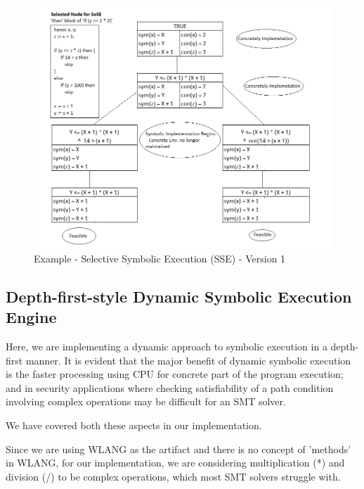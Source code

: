 \documentclass[11pt]{llncs}
\begin{document}
			\begin{figure}[H]
				\includegraphics[width=1.05\textwidth]{SeSE_Version1_Example.png}
				\caption{Example - Selective Symbolic Execution (SSE) - Version 1} \label{fig_4}
			\end{figure}
			
			\vspace{-2mm}


	\subsection{Depth-first-style Dynamic Symbolic Execution Engine} \label{Depth-first-style Dynamic Symbolic Execution Engine}
		Here, we are implementing a dynamic approach to symbolic execution in a depth-first manner.
		It is evident that the major benefit of dynamic symbolic execution is the faster processing using CPU for concrete part of the program execution; and in security applications where checking satisfiability of a path condition involving complex operations may be difficult for an SMT solver.

		\vspace{2mm}

		We have covered both these aspects in our implementation.
		
		\vspace{2mm}
		
		Since we are using WLANG as the artifact and there is no concept of 'methods' in WLANG, for our implementation, we are considering multiplication (*) and division (/) to be complex operations, which most SMT solvers struggle with.
\end{document}
